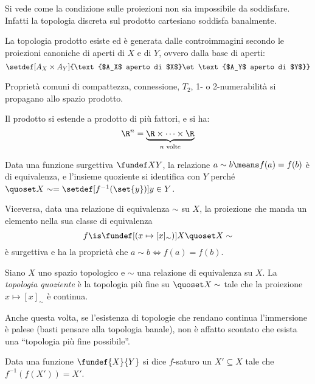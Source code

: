 \begin{oss}
	Si vede come la condizione sulle proiezioni non sia impossibile da soddisfare.
	Infatti la topologia discreta sul prodotto cartesiano soddisfa banalmente.
\end{oss}

\begin{fat}
	La topologia prodotto esiste
	ed è generata dalle controimmagini secondo le proiezioni canoniche di aperti di $X$ e di $Y$,
	ovvero dalla base di aperti:
	\[\setdef[A_X\times A_Y]{\text{$A_X$ aperto di $X$}\et\text{$A_Y$ aperto di $Y$}}\]
\end{fat}

\begin{fat}
	Proprietà comuni di compattezza, connessione, $T_2$, 1- o 2-numerabilità
	si propagano allo spazio prodotto.
\end{fat}

\begin{oss}
	Il prodotto si estende a prodotto di più fattori, e si ha:
	\[\R^n=\underbrace{\R\times\dots\times\R}_\text{$n$ volte}\]
\end{oss}

\begin{oss}
	Data una funzione surgettiva $\fundef XY$,
	la relazione $a\sim b\means f(a)=f(b)$ è di equivalenza,
	e l'insieme quoziente si identifica con $Y$
	perché $\quoset X\sim=\setdef[f^{-1}(\set{y})]{y\in Y}$.
	
	Viceversa, data una relazione di equivalenza $\sim$ su $X$,
	la proiezione che manda un elemento nella sua classe di equivalenza
	\[f\is\fundef[{(x\mapsto [x]_\sim)}]X{\quoset X\sim}\]
	è surgettiva e ha la proprietà che $a\sim b\iff f(a)=f(b)$.
\end{oss}

\begin{defn}
	Siano $X$ uno spazio topologico e $\sim$ una relazione di equivalenza su $X$.
	La \emph{topologia quoziente} è la topologia più fine su $\quoset X\sim$
	tale che la proiezione $x\mapsto[x]_\sim$ è continua.
\end{defn}

\begin{oss}
	Anche questa volta, se l'esistenza di topologie che rendano continua l'immersione è palese
	(basti pensare alla topologia banale),
	non è affatto scontato che esista una ``topologia più fine possibile''.
\end{oss}

\begin{defn}
	Data una funzione $\fundef{X}{Y}$ si dice $f$-saturo un $X'\subseteq X$ tale che $f^{-1}(f(X'))=X'$.
\end{defn}

